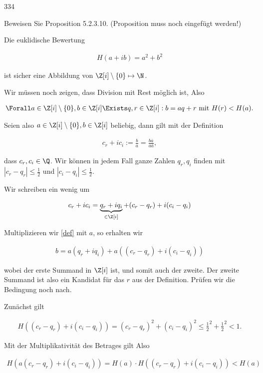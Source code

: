 \begin{algebraUE}{334}

Beweisen Sie Proposition 5.2.3.10. (Proposition muss noch eingefügt werden!)

\end{algebraUE}

\begin{solution}

Die euklidische Bewertung

\begin{align*}
  H(a+ib) = a^2 + b^2
\end{align*}

ist sicher eine Abbildung von $\Z [i] \setminus \{0\} \mapsto \N$.

Wir müssen noch zeigen, dass Division mit Rest möglich ist, Also

\begin{align*}
  \Forall a \in \Z [i] \setminus \{0\}, b \in \Z [i] \Exists q,r \in \Z [i]: b = aq + r \text{~mit~} H(r) < H(a).
\end{align*}

Seien also $a \in \Z [i] \setminus \{0\}, b \in \Z [i]$ beliebig, dann gilt mit der Definition

\begin{align}\label{def}
  c_r + i c_i := \frac{b}{a} = \frac{b\overline{a}}{a\overline{a}},
\end{align}

dass $c_r, c_i \in \Q$. Wir können in jedem Fall ganze Zahlen $q_r, q_i$ finden mit $|c_r-q_r| \leq \frac{1}{2}$ und $|c_i-q_i| \leq \frac{1}{2}$.

Wir schreiben ein wenig um

\begin{align*}
  c_r + i c_i = \underbrace{q_r + i q_i}_{\in \Z [i]} + (c_r- q_r) + i (c_i - q_i)
\end{align*}

Multiplizieren wir \eqref{def} mit $a$, so erhalten wir

\begin{align*}
  b = a(q_r + i q_i) + a((c_r- q_r) + i (c_i - q_i))
\end{align*}

wobei der erste Summand in $\Z [i]$ ist, und somit auch der zweite. Der zweite Summand ist also ein Kandidat für das $r$ aus der Definition. Prüfen wir die Bedingung noch nach.

Zunächst gilt

\begin{align*}
  H((c_r- q_r) + i (c_i - q_i)) = (c_r- q_r)^2 + (c_i - q_i)^2 \leq \frac{1}{2}^2 + \frac{1}{2}^2 < 1.
\end{align*}

Mit der Multiplikativität des Betrages gilt Also

\begin{align*}
  H(a(c_r- q_r) + i (c_i - q_i)) = H(a) \cdot H((c_r- q_r) + i (c_i - q_i)) < H(a)
\end{align*}


\end{solution}
